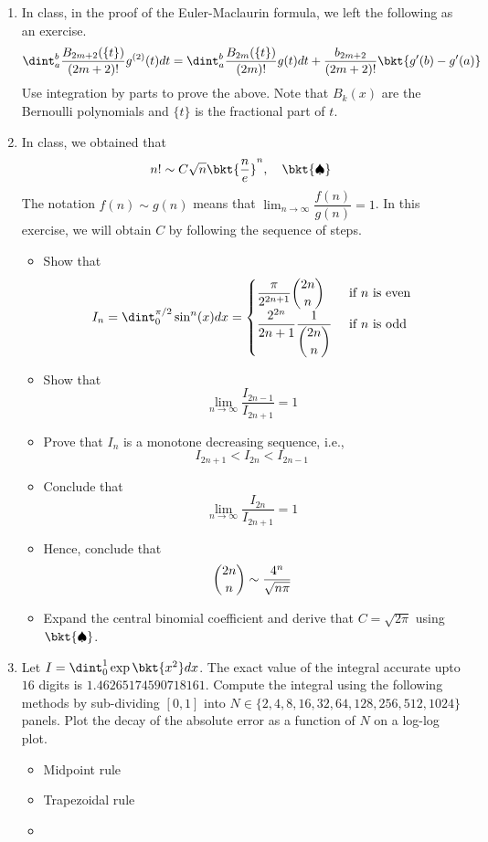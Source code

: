 \documentclass{article}
\begin{document}
	\begin{enumerate}
		\item
		In class, in the proof of the Euler-Maclaurin formula, we left the following as an exercise.
		$$\dint_a^b \dfrac{B_{2m+2}(\{t\})}{(2m+2)!} g^{(2)}(t)dt = \dint_a^b \dfrac{B_{2m}(\{t\})}{(2m)!} g(t)dt + \dfrac{b_{2m+2}}{(2m+2)!} \bkt{g'(b)-g'(a)}$$
		Use integration by parts to prove the above. Note that $B_k(x)$ are the Bernoulli polynomials and $\{t\}$ is the fractional part of $t$.
		\item
		In class, we obtained that
		$$n! \sim C \sqrt{n} \bkt{\dfrac{n}{e}}^n, \,\,\,\,\,\, \bkt{\spadesuit}$$
		The notation $f(n) \sim g(n)$ means that $\lim_{n \to \infty} \dfrac{f(n)}{g(n)} = 1$. In this exercise, we will obtain $C$ by following the sequence of steps.
		\begin{itemize}
			\item
			Show that
			$$I_n=\dint_0^{\pi/2} \sin^{n}(x)dx = \begin{cases}
			\dfrac{\pi}{2^{2n+1}} \dbinom{2n}n & \text{ if $n$ is even}\\
			\dfrac{2^{2n}}{2n+1} \dfrac1{\dbinom{2n}n} & \text{ if $n$ is odd}\\
			\end{cases}$$
			\item
			Show that
			$$\lim_{n \to \infty}\dfrac{I_{2n-1}}{I_{2n+1}} = 1$$
			\item
			Prove that $I_n$ is a monotone decreasing sequence, i.e.,
			$$I_{2n+1} < I_{2n} < I_{2n-1}$$
			\item
			Conclude that
			$$\lim_{n \to \infty}\dfrac{I_{2n}}{I_{2n+1}} = 1$$
			\item
			Hence, conclude that
			$$\dbinom{2n}n \sim \dfrac{4^n}{\sqrt{n \pi}}$$
			\item
			Expand the central binomial coefficient and derive that $C = \sqrt{2\pi}$ using $\bkt{\spadesuit}$.
		\end{itemize}
		\item
		Let $I = \dint_0^1 \exp\bkt{x^2}dx$. The exact value of the integral accurate upto $16$ digits is $1.46265174590718161$. Compute the integral using the following methods by sub-dividing $[0,1]$ into $N \in \{2,4,8,16,32,64,128,256,512,1024\}$ panels. Plot the decay of the absolute error as a function of $N$ on a log-log plot.
		\begin{itemize}
			\item
			Midpoint rule
			\item
			Trapezoidal rule
			\item

\end{itemize}
\end{enumerate}
\end{document}
